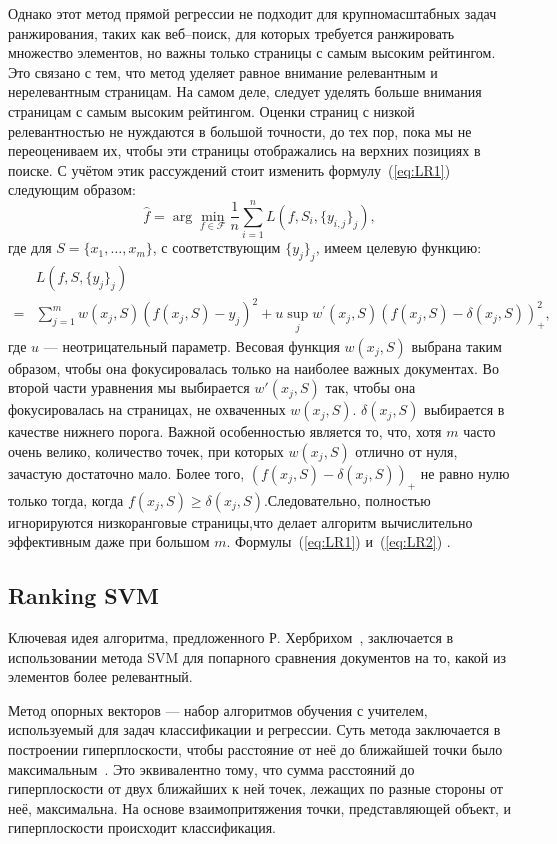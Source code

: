 Однако этот метод прямой регрессии не подходит для крупномасштабных задач ранжирования, таких как веб--поиск, для которых требуется ранжировать множество элементов, но важны только страницы с самым высоким рейтингом. Это связано с тем, что метод уделяет равное внимание релевантным и нерелевантным страницам. На самом деле, следует уделять больше внимания страницам с самым высоким рейтингом. Оценки страниц с низкой релевантностью не нуждаются в большой точности, до тех пор, пока мы не переоцениваем их, чтобы эти страницы отображались на верхних позициях в поиске. С учётом этик рассуждений стоит изменить формулу~(\ref{eq:LR1}) следующим образом:
{\begin{equation}
	\label{eq:LR2}
	\hat{f}=\arg \min _{f \in \mathcal{F}} \frac{1}{n} \sum_{i=1}^n L(f, S_i,\{y_{i, j}\}_j),
\end{equation}}
где для $S = \{x_{1}, \dots, x_{m}\}$, с соответствующим $\{y_{j}\}_{j}$, имеем целевую функцию:
\[
\begin{aligned}
	& L(f, S,\{y_j\}_j) \\
	= & \sum_{j=1}^m w(x_j, S)(f(x_j, S)-y_j)^2+u \sup _j w^{\prime}(x_j, S)(f(x_j, S)-\delta(x_j, S))_{+}^2,
\end{aligned}
\]
где $u$ --- неотрицательный параметр. Весовая функция $w(x_j, S)$ выбрана таким образом, чтобы она фокусировалась только на наиболее важных документах. Во второй части уравнения мы выбирается $w'(x_j, S)$ так, чтобы она фокусировалась на страницах, не охваченных $w(x_j, S)$. $\delta(x_j, S)$ выбирается в качестве нижнего порога. Важной особенностью является то, что, хотя $m$ часто очень велико, количество точек, при которых $w(x_j, S)$ отлично от нуля, зачастую достаточно мало. Более того, $(f(x_j, S)-\delta(x_j, S))_{+}$ не равно нулю только тогда, когда $f(x_j, S) \geq \delta(x_j, S)$.Следовательно, полностью игнорируются низкоранговые страницы,что делает алгоритм вычислительно эффективным даже при большом $m$. Формулы~(\ref{eq:LR1}) и~(\ref{eq:LR2}) \cite{LR}. 

\subsection{Ranking SVM}

Ключевая идея алгоритма, предложенного Р. Хербрихом~\cite{RankSVM}, заключается в использовании метода SVM для попарного сравнения документов на то, какой из элементов более релевантный. 

Метод опорных векторов --- набор алгоритмов обучения с учителем, используемый для задач классификации и регрессии. Суть метода заключается в построении гиперплоскости, чтобы расстояние от неё до ближайшей точки было максимальным~\cite{ML_no_wors}. Это эквивалентно тому, что сумма расстояний до гиперплоскости от двух ближайших к ней точек, лежащих по разные стороны от неё, максимальна. На основе взаимопритяжения точки, представляющей объект, и гиперплоскости происходит  классификация.

